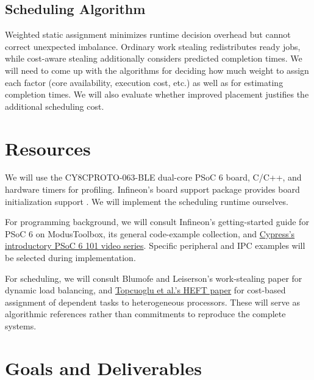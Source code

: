 \documentclass[11pt]{article}
\begin{document}
\subsection{Scheduling Algorithm}
Weighted static assignment minimizes runtime decision overhead but cannot
correct unexpected imbalance. Ordinary work stealing redistributes ready
jobs, while cost-aware stealing additionally considers predicted completion
times. We will need to come up with the algorithms for deciding how much weight to assign each factor (core availability, execution cost, etc.) as well as for estimating completion times. We will also evaluate whether improved placement justifies the additional scheduling cost.


\section{Resources}
We will use the CY8CPROTO-063-BLE dual-core PSoC 6 board, C/C++,
and hardware timers for profiling. Infineon's board support package
provides board initialization support \cite{psoc-board}. We will
implement the scheduling runtime ourselves.

For programming background, we will consult Infineon's getting-started
guide for PSoC 6 on ModusToolbox, its general code-example collection,
and \href{https://youtube.com/playlist?list=PLIOkqhZiy83H81AhLcjwIKkB9w07JQZS6&si=GrjLfIfy3ogX0vyl}{Cypress's introductory PSoC 6 101 video series}. Specific peripheral and IPC
examples will be selected during implementation.

For scheduling, we will consult Blumofe and Leiserson's work-stealing
paper for dynamic load balancing, and \href{https://doi.org/10.1109/71.993206}{Topcuoglu et al.'s HEFT paper}
for cost-based assignment of dependent tasks to heterogeneous
processors. These will serve as algorithmic
references rather than commitments to reproduce the complete systems.

\section{Goals and Deliverables}
\end{document}

